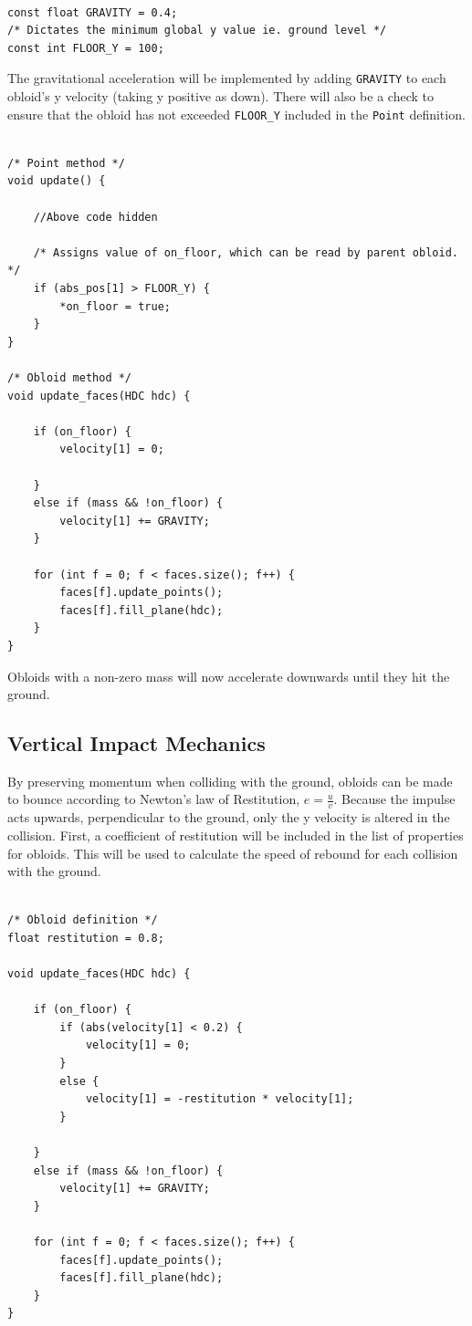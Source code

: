 \documentclass{article}
\begin{document}
\begin{lstlisting}

const float GRAVITY = 0.4;
/* Dictates the minimum global y value ie. ground level */
const int FLOOR_Y = 100;

\end{lstlisting}

The gravitational acceleration will be implemented by adding \verb|GRAVITY| to each obloid's y velocity (taking y positive as down). There will also be a check to ensure that the obloid has not exceeded \verb|FLOOR_Y| included in the \verb|Point| definition.
\newpage
\begin{lstlisting}

/* Point method */
void update() {
	
	//Above code hidden

	/* Assigns value of on_floor, which can be read by parent obloid. */
	if (abs_pos[1] > FLOOR_Y) {
		*on_floor = true;
	}
}

/* Obloid method */
void update_faces(HDC hdc) {
	
	if (on_floor) {
		velocity[1] = 0;

	}
	else if (mass && !on_floor) {
		velocity[1] += GRAVITY;
	}
			
	for (int f = 0; f < faces.size(); f++) {
		faces[f].update_points();
		faces[f].fill_plane(hdc);
	}
}

\end{lstlisting}
Obloids with a non-zero mass will now accelerate downwards until they hit the ground.

\subsection{Vertical Impact Mechanics}

By preserving momentum when colliding with the ground, obloids can be made to bounce according to Newton's law of Restitution, $ e = \frac{u}{v} $. Because the impulse acts upwards, perpendicular to the ground, only the y velocity is altered in the collision. First, a coefficient of restitution will be included in the list of properties for obloids. This will be used to calculate the speed of rebound for each collision with the ground.
\newpage
\begin{lstlisting}

/* Obloid definition */
float restitution = 0.8;

void update_faces(HDC hdc) {
	
	if (on_floor) {
		if (abs(velocity[1] < 0.2) {	
			velocity[1] = 0;
		}
		else {
			velocity[1] = -restitution * velocity[1];
		}

	}
	else if (mass && !on_floor) {
		velocity[1] += GRAVITY;
	}
			
	for (int f = 0; f < faces.size(); f++) {
		faces[f].update_points();
		faces[f].fill_plane(hdc);
	}
}

\end{lstlisting}
\end{document}
